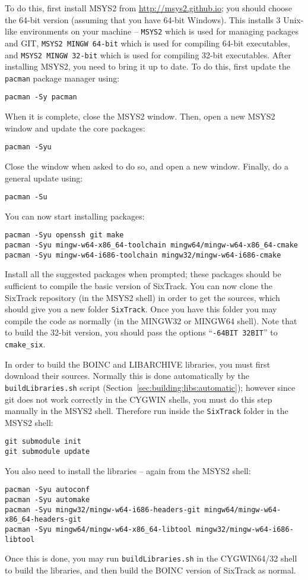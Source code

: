 \documentclass[english,BCOR=0mm,DIV=18]{scrartcl}
\begin{document}
To do this, first install MSYS2 from \url{http://msys2.github.io}; you should choose the 64-bit version (assuming that you have 64-bit Windows).
This installs 3 Unix-like environments on your machine -- \texttt{MSYS2} which is used for managing packages and GIT, \texttt{MSYS2 MINGW 64-bit} which is used for compiling 64-bit executables, and \texttt{MSYS2 MINGW 32-bit} which is used for compiling 32-bit executables.
After installing MSYS2, you need to bring it up to date.
To do this, first update the \texttt{pacman} package manager using:
\begin{lstlisting}
pacman -Sy pacman
\end{lstlisting}
When it is complete, close the MSYS2 window.
Then, open a new MSYS2 window and update the core packages:
\begin{lstlisting}
pacman -Syu
\end{lstlisting}
Close the window when asked to do so, and open a new window.
Finally, do a general update using:
\begin{lstlisting}
pacman -Su
\end{lstlisting}
You can now start installing packages:
\begin{lstlisting}
pacman -Syu openssh git make
pacman -Syu mingw-w64-x86_64-toolchain mingw64/mingw-w64-x86_64-cmake
pacman -Syu mingw-w64-i686-toolchain mingw32/mingw-w64-i686-cmake
\end{lstlisting}
Install all the suggested packages when prompted; these packages should be sufficient to compile the basic version of SixTrack.
You can now clone the SixTrack repository (in the MSYS2 shell) in order to get the sources, which should give you a new folder \texttt{SixTrack}.
Once you have this folder you may compile the code as normally (in the MINGW32 or MINGW64 shell).
Note that to build the 32-bit version, you should pass the options ``\texttt{-64BIT 32BIT}'' to \texttt{cmake\_six}.

In order to build the BOINC and LIBARCHIVE libraries, you must first download their sources.
Normally this is done automatically by the \texttt{buildLibraries.sh} script (Section~\ref{sec:building:libs:automatic}); however since git does not work correctly in the CYGWIN shells, you must do this step manually in the MSYS2 shell.
Therefore run inside the \texttt{SixTrack} folder in the MSYS2 shell:
\begin{lstlisting}
git submodule init
git submodule update
\end{lstlisting}
You also need to install the libraries -- again from the MSYS2 shell:
\begin{lstlisting}
pacman -Syu autoconf
pacman -Syu automake
pacman -Syu mingw32/mingw-w64-i686-headers-git mingw64/mingw-w64-x86_64-headers-git
pacman -Syu mingw64/mingw-w64-x86_64-libtool mingw32/mingw-w64-i686-libtool
\end{lstlisting}
Once this is done, you may run \texttt{buildLibraries.sh} in the CYGWIN64/32 shell to build the libraries, and then build the BOINC version of SixTrack as normal.
\end{document}
